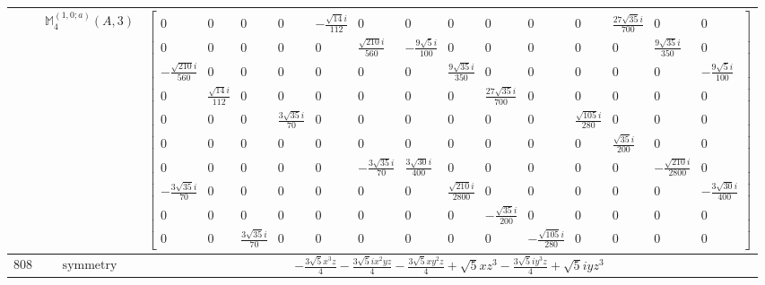 \documentclass[fleqn,8pt,landscape]{jsarticle}
\begin{document}
\begin{longtable}{ccc}
$  $ & $ \mathbb{M}_{4}^{(1,0;a)}(A,3) $ & $ \begin{bmatrix} 0 & 0 & 0 & 0 & - \frac{\sqrt{14} i}{112} & 0 & 0 & 0 & 0 & 0 & 0 & \frac{27 \sqrt{35} i}{700} & 0 & 0 \\ 0 & 0 & 0 & 0 & 0 & \frac{\sqrt{210} i}{560} & - \frac{9 \sqrt{5} i}{100} & 0 & 0 & 0 & 0 & 0 & \frac{9 \sqrt{35} i}{350} & 0 \\ - \frac{\sqrt{210} i}{560} & 0 & 0 & 0 & 0 & 0 & 0 & \frac{9 \sqrt{35} i}{350} & 0 & 0 & 0 & 0 & 0 & - \frac{9 \sqrt{5} i}{100} \\ 0 & \frac{\sqrt{14} i}{112} & 0 & 0 & 0 & 0 & 0 & 0 & \frac{27 \sqrt{35} i}{700} & 0 & 0 & 0 & 0 & 0 \\ 0 & 0 & 0 & \frac{3 \sqrt{35} i}{70} & 0 & 0 & 0 & 0 & 0 & 0 & \frac{\sqrt{105} i}{280} & 0 & 0 & 0 \\ 0 & 0 & 0 & 0 & 0 & 0 & 0 & 0 & 0 & 0 & 0 & \frac{\sqrt{35} i}{200} & 0 & 0 \\ 0 & 0 & 0 & 0 & 0 & - \frac{3 \sqrt{35} i}{70} & \frac{3 \sqrt{30} i}{400} & 0 & 0 & 0 & 0 & 0 & - \frac{\sqrt{210} i}{2800} & 0 \\ - \frac{3 \sqrt{35} i}{70} & 0 & 0 & 0 & 0 & 0 & 0 & \frac{\sqrt{210} i}{2800} & 0 & 0 & 0 & 0 & 0 & - \frac{3 \sqrt{30} i}{400} \\ 0 & 0 & 0 & 0 & 0 & 0 & 0 & 0 & - \frac{\sqrt{35} i}{200} & 0 & 0 & 0 & 0 & 0 \\ 0 & 0 & \frac{3 \sqrt{35} i}{70} & 0 & 0 & 0 & 0 & 0 & 0 & - \frac{\sqrt{105} i}{280} & 0 & 0 & 0 & 0 \end{bmatrix} $ \\ \hline
$ 808 $ & $ \text{symmetry} $ & $ - \frac{3 \sqrt{5} x^{3} z}{4} - \frac{3 \sqrt{5} i x^{2} y z}{4} - \frac{3 \sqrt{5} x y^{2} z}{4} + \sqrt{5} x z^{3} - \frac{3 \sqrt{5} i y^{3} z}{4} + \sqrt{5} i y z^{3} $ \\

\end{longtable}
\end{document}

